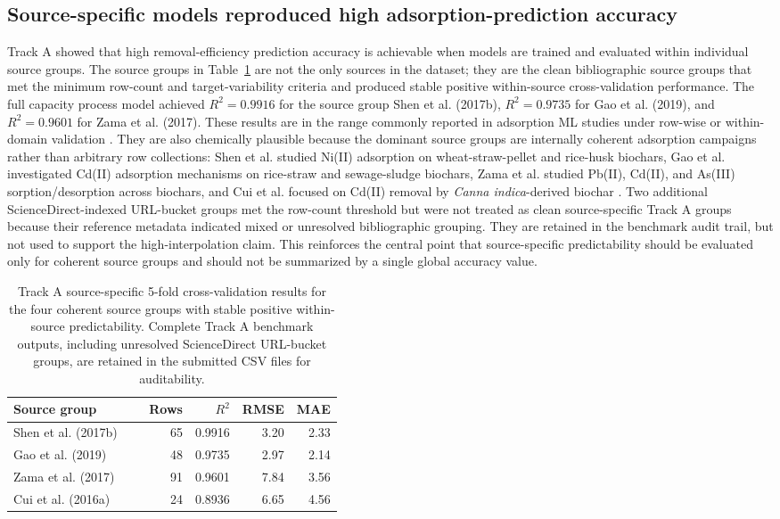 \documentclass[review,12pt,number]{elsarticle}
\begin{document}
\subsection{Source-specific models reproduced high adsorption-prediction accuracy}

Track A showed that high removal-efficiency prediction accuracy is achievable when models are trained and evaluated within individual source groups. The source groups in Table~\ref{tab:tracka} are not the only sources in the dataset; they are the clean bibliographic source groups that met the minimum row-count and target-variability criteria and produced stable positive within-source cross-validation performance. The full capacity process model achieved $R^2 = 0.9916$ for the source group Shen et al. (2017b), $R^2 = 0.9735$ for Gao et al. (2019), and $R^2 = 0.9601$ for Zama et al. (2017). These results are in the range commonly reported in adsorption ML studies under row-wise or within-domain validation \cite{hafsa2020,wang2024,lu2022}. They are also chemically plausible because the dominant source groups are internally coherent adsorption campaigns rather than arbitrary row collections: Shen et al. studied Ni(II) adsorption on wheat-straw-pellet and rice-husk biochars, Gao et al. investigated Cd(II) adsorption mechanisms on rice-straw and sewage-sludge biochars, Zama et al. studied Pb(II), Cd(II), and As(III) sorption/desorption across biochars, and Cui et al. focused on Cd(II) removal by \textit{Canna indica}-derived biochar \cite{shen2017,gao2019,zama2017,cui2016}. Two additional ScienceDirect-indexed URL-bucket groups met the row-count threshold but were not treated as clean source-specific Track A groups because their reference metadata indicated mixed or unresolved bibliographic grouping. They are retained in the benchmark audit trail, but not used to support the high-interpolation claim. This reinforces the central point that source-specific predictability should be evaluated only for coherent source groups and should not be summarized by a single global accuracy value.

\begin{table}[htbp]
\centering
\caption{Track A source-specific 5-fold cross-validation results for the four coherent source groups with stable positive within-source predictability. Complete Track A benchmark outputs, including unresolved ScienceDirect URL-bucket groups, are retained in the submitted CSV files for auditability.}
\label{tab:tracka}
\small
\begin{tabular}{>{\raggedright\arraybackslash}p{0.43\linewidth}rrrr}
\toprule
Source group & Rows & $R^2$ & RMSE & MAE \\
\midrule
Shen et al. (2017b) & 65 & 0.9916 & 3.20 & 2.33 \\
Gao et al. (2019) & 48 & 0.9735 & 2.97 & 2.14 \\
Zama et al. (2017) & 91 & 0.9601 & 7.84 & 3.56 \\
Cui et al. (2016a) & 24 & 0.8936 & 6.65 & 4.56 \\
\bottomrule
\end{tabular}
\end{table}
\end{document}
